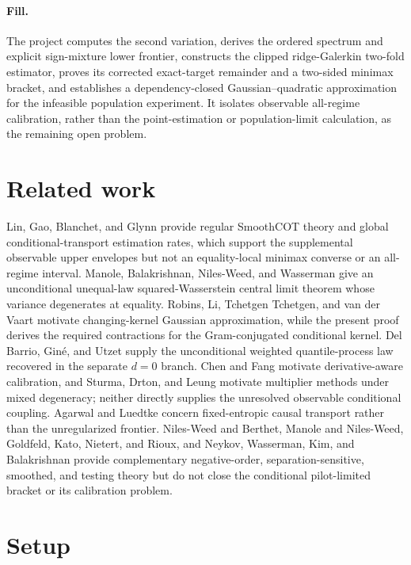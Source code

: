 \documentclass{article}
\begin{document}
\paragraph{Fill.} The project computes the second variation, derives the ordered spectrum and explicit sign-mixture lower frontier, constructs the clipped ridge-Galerkin two-fold estimator, proves its corrected exact-target remainder and a two-sided minimax bracket, and establishes a dependency-closed Gaussian--quadratic approximation for the infeasible population experiment. It isolates observable all-regime calibration, rather than the point-estimation or population-limit calculation, as the remaining open problem.

\section{Related work}

Lin, Gao, Blanchet, and Glynn provide regular SmoothCOT theory and global conditional-transport estimation rates, which support the supplemental observable upper envelopes but not an equality-local minimax converse or an all-regime interval. Manole, Balakrishnan, Niles-Weed, and Wasserman give an unconditional unequal-law squared-Wasserstein central limit theorem whose variance degenerates at equality. Robins, Li, Tchetgen Tchetgen, and van der Vaart motivate changing-kernel Gaussian approximation, while the present proof derives the required contractions for the Gram-conjugated conditional kernel. Del Barrio, Gin\'e, and Utzet supply the unconditional weighted quantile-process law recovered in the separate \(d=0\) branch. Chen and Fang motivate derivative-aware calibration, and Sturma, Drton, and Leung motivate multiplier methods under mixed degeneracy; neither directly supplies the unresolved observable conditional coupling. Agarwal and Luedtke concern fixed-entropic causal transport rather than the unregularized frontier. Niles-Weed and Berthet, Manole and Niles-Weed, Goldfeld, Kato, Nietert, and Rioux, and Neykov, Wasserman, Kim, and Balakrishnan provide complementary negative-order, separation-sensitive, smoothed, and testing theory but do not close the conditional pilot-limited bracket or its calibration problem.

\section{Setup}
\end{document}
